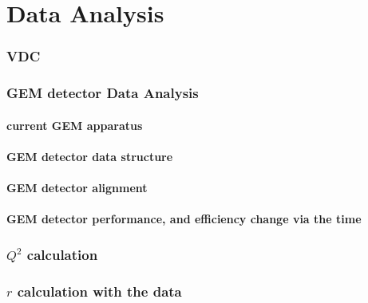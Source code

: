 \chapter{Data Analysis}
\subsection{VDC}
\subsection{GEM detector Data Analysis}
\subsubsection{current GEM apparatus}
\subsubsection{GEM detector data structure}
\subsubsection{GEM detector alignment}
\subsubsection{GEM detector performance, and efficiency change via the time}
\subsection{$Q^2$ calculation}
\subsection{$r$ calculation with the data}
